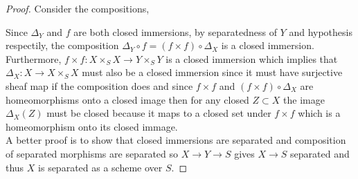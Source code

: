 \documentclass[12pt]{article}
\begin{document}
\begin{enumerate}
\begin{proof}
Consider the compositions,
\begin{center}
\end{center}
Since $\Delta_Y$ and $f$ are both closed immersions, by separatedness of $Y$ and hypothesis respectily, the composition $\Delta_Y \circ f = (f \times f) \circ \Delta_X$ is a closed immersion. Furthermore, $f \times f : X \times_S X \to Y \times_S Y$ is a closed immersion which implies that $\Delta_X : X \to X \times_S X$ must also be a closed immersion since it must have surjective sheaf map if the composition does and since $f \times f$ and $(f \times f) \circ \Delta_X$ are homeomorphisms onto a closed image then for any closed $Z \subset X$ the image $\Delta_X(Z)$ must be closed because it maps to a closed set under $f \times f$ which is a homeomorphism onto its closed immage.
\bigskip\\
A better proof is to show that closed immersions are separated and composition of separated morphisms are separated so $X \to Y \to S$ gives $X \to S$ separated and thus $X$ is separated as a scheme over $S$.
\end{proof}


\end{enumerate}
\end{document}
